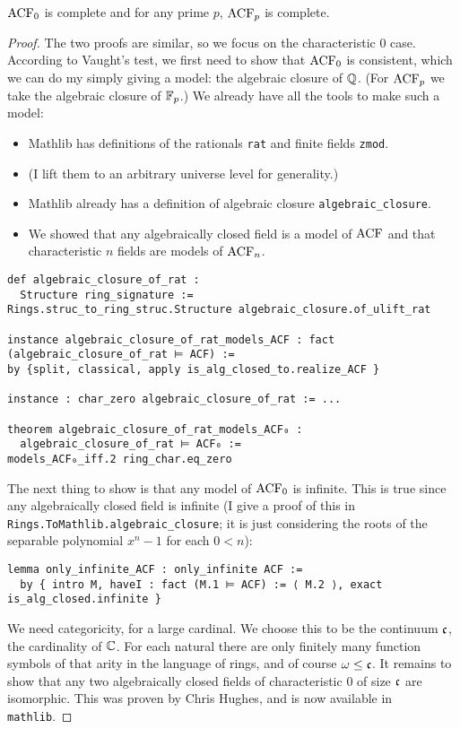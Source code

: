 \begin{prop}
  $\operatorname{ACF}_{0}$ is complete and for any prime $p$, $\operatorname{ACF}_{p}$ is complete.
\end{prop}
\begin{proof}
  The two proofs are similar, so we focus on the characteristic $0$ case.
  According to Vaught's test, we first need to show that $\operatorname{ACF}_{0}$ is consistent,
  which we can do my simply giving a model: the algebraic closure of $\mathbb{Q}$.
  (For $\operatorname{ACF}_{p}$ we take the algebraic closure of $\mathbb{F}_{p}$.)
  We already have all the tools to make such a model:
  \begin{itemize}
    \item Mathlib has definitions of the rationals \texttt{rat} and finite fields \texttt{zmod}.
    \item (I lift them to an arbitrary universe level for generality.)
    \item Mathlib already has a definition of algebraic closure \texttt{algebraic\_closure}.
    \item We showed that any algebraically closed field is a model of $\operatorname{ACF}$
          and that characteristic $n$ fields are models of $\operatorname{ACF}_{n}$.
  \end{itemize}
  \begin{lstlisting}
def algebraic_closure_of_rat :
  Structure ring_signature :=
Rings.struc_to_ring_struc.Structure algebraic_closure.of_ulift_rat

instance algebraic_closure_of_rat_models_ACF : fact (algebraic_closure_of_rat ⊨ ACF) :=
by {split, classical, apply is_alg_closed_to.realize_ACF }

instance : char_zero algebraic_closure_of_rat := ...

theorem algebraic_closure_of_rat_models_ACF₀ :
  algebraic_closure_of_rat ⊨ ACF₀ :=
models_ACF₀_iff.2 ring_char.eq_zero \end{lstlisting}

The next thing to show is that any model of $\operatorname{ACF}_{0}$ is infinite.
This is true since any algebraically closed field is infinite
(I give a proof of this in \texttt{Rings.ToMathlib.algebraic\_closure};
it is just considering the roots of the separable polynomial $x^{n} - 1$ for each $0 < n$):
\begin{lstlisting}
lemma only_infinite_ACF : only_infinite ACF :=
  by { intro M, haveI : fact (M.1 ⊨ ACF) := ⟨ M.2 ⟩, exact is_alg_closed.infinite }\end{lstlisting}

We need categoricity, for a large cardinal.
We choose this to be the continuum $\mathfrak{c}$, the cardinality of $\mathbb{C}$.
For each natural there are only finitely many function symbols
of that arity in the language of rings, and of course $\omega \le \mathfrak{c}$.
It remains to show that any two algebraically closed fields of characteristic $0$
of size $\mathfrak{c}$ are isomorphic.
This was proven by Chris Hughes,
and is now available in \texttt{mathlib}.


\end{proof}

